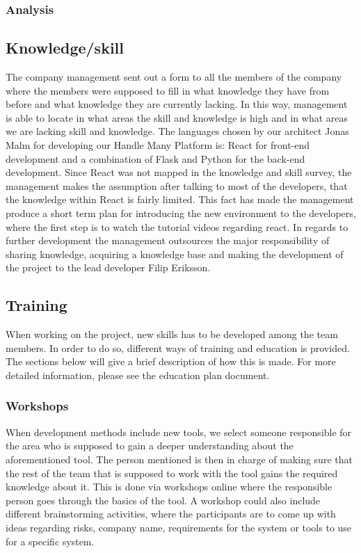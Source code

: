 \subsubsection{Analysis}

\subsection{Knowledge/skill}
The company management sent out a form to all the members of the company where the members were supposed to fill in what knowledge they have from before and what knowledge they are currently lacking. In this way, management is able to locate in what areas the skill and knowledge is high and in what areas we are lacking skill and knowledge. The languages chosen by our architect Jonas Malm for developing our Handle Many Platform is: React for front-end development and a combination of Flask and Python for the back-end development. Since React was not mapped in the knowledge and skill survey, the management makes the assumption after talking to most of the developers, that the knowledge within React is fairly limited. This fact has made the management produce a short term plan for introducing the new environment to the developers, where the first step is to watch the tutorial videos regarding react. In regards to further development the management outsources the major responsibility of sharing knowledge, acquiring a knowledge base and making the development of the project to the lead developer Filip Eriksson. 

\subsection{Training}
When working on the project, new skills has to be developed among the team members. In order to do so, different ways of training and education is provided. The sections below will give a brief description of how this is made. For more detailed information, please see the education plan document. 
\subsubsection{Workshops}
When development methods include new tools, we select someone responsible for the area who is supposed to gain a deeper understanding about the aforementioned tool. The person mentioned is then in charge of making sure that the rest of the team that is supposed to work with the tool gains the required knowledge about it. This is done via workshops online where the responsible person goes through the basics of the tool.  A workshop could also include different brainstorming activities, where the participants are to come up with ideas regarding risks, company name, requirements for the system or tools to use for a specific system. 

